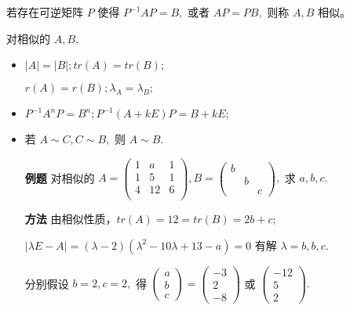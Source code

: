 
若存在可逆矩阵 $ P $ 使得 $ P^{-1}AP = B, $ 或者 $ AP = PB, $ 则称 $ A,B $ 相似。


对相似的 $ A,B, $ 

\begin{itemize}
    \item $ |A| = |B|; tr(A) = tr(B); $ 
    
    $ r(A) = r(B); \lambda_A = \lambda_B; $ 
    \item $ P^{-1}A^nP = B^{n}; P^{-1}(A+kE)P = B+kE; $ 
    \item 若 $ A\sim C, C\sim B, $ 则 $ A\sim B. $ 
\end{itemize}

\begin{itemize}
    \item[\textbf{例题}] 对相似的 $ A = \begin{pmatrix}
        1&a&1\\1&5&1\\4&12&6\\
    \end{pmatrix},B = \begin{pmatrix}
        b&&\\&b&\\&&c
    \end{pmatrix}, $ 求 $ a,b,c. $ 
    \item[\textbf{方法}] 由相似性质，$ tr(A) = 12 = tr(B) = 2b + c; $
    
    $ |\lambda E-A| = (\lambda-2)(\lambda^2 - 10\lambda +13 - a)=0 $ 
    有解 $ \lambda = b,b,c. $ 
    
    分别假设 $ b = 2,c = 2, $ 得
    $ \begin{pmatrix}
        a\\b\\c
    \end{pmatrix} = \begin{pmatrix}
        -3 \\ 2 \\ -8
    \end{pmatrix} $ 或
    $ \begin{pmatrix}
        -12\\5\\2
    \end{pmatrix}. $ 
\end{itemize}

